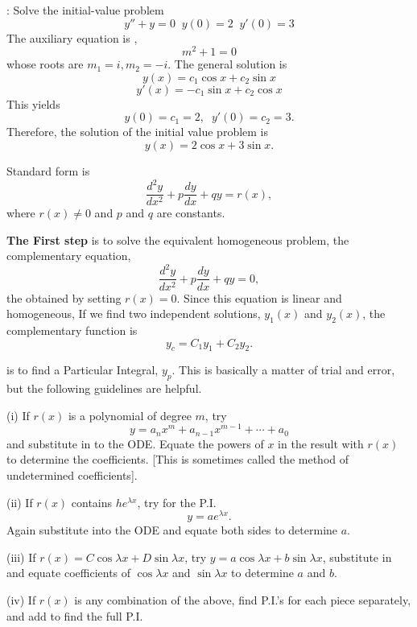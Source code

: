 \documentclass{article}
\begin{document}
\hrulefill
\bigskip

: Solve the initial-value problem
$$
y''+ y=0 \;\; y(0)=2 \;\; y'(0)=3
$$
The auxiliary equation is ,
$$
m^2+1=0
$$
whose roots are $m_1=i, m_2=-i$. The general solution is
$$
y(x)=c_1 \cos x + c_2 \sin x
$$
$$
y'(x)= -c_1 \sin x + c_2 \cos x
$$
This yields
$$
y(0)=c_1=2, \;\;  y'(0)=c_2=3.
$$
Therefore,  the  solution of the initial value problem is
$$
y(x)=2 \cos x +3 \sin x.
$$

\hrulefill
\bigskip

Standard form is
$$
\frac{d^2 y}{dx^2} + p \frac{dy}{dx} + q  y = r(x),
$$
where $ r(x) \ne 0$ and $p$ and $q$ are constants.

\bigskip

{\bf The First step} is to solve the equivalent homogeneous problem,
the complementary equation,
$$
\frac{d^2 y}{dx^2} + p \frac{dy}{dx} + q  y = 0,
$$
the obtained by setting $r(x)=0$. Since this equation is linear
and homogeneous, If we find two independent solutions, $y_1(x)$
and $y_2(x)$, the  complementary function is
$$
y_c = C_1 y_1+ C_2 y_2.
$$

\bigskip

 is to find a Particular Integral,
$y_p$. This is basically a matter of trial and error, but the
following guidelines are helpful.

\bigskip

(i) If $r(x)$ is a polynomial of degree $m$, try
$$
y = a_n x^m + a_{n-1} x^{m-1} + \cdots +a_0
$$
and substitute in to the ODE. Equate the powers of $x$ in the
result with $r(x)$ to determine the coefficients. [This is
sometimes called the method of undetermined coefficients].

\bigskip

(ii) If $r(x)$ contains $h e^{\lambda x}$, try for the P.I.
$$
y= a e^{\lambda x}.
$$
Again substitute into the ODE and equate both sides to determine
$a$.

\bigskip

(iii) If $r(x) = C \cos \lambda x + D \sin \lambda x$, try $y = a
\cos \lambda x + b \sin \lambda x$, substitute in and equate
coefficients of $\cos \lambda x$ and $ \sin \lambda x$ to
determine $a$ and $b$.

\bigskip

(iv) If $r(x)$ is any combination of the above, find P.I.'s for
each piece separately, and add to find the full P.I.
\end{document}
